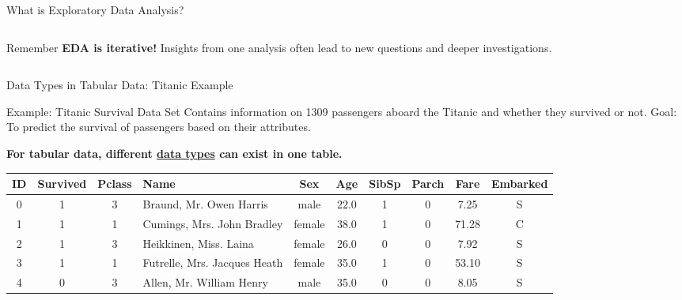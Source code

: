 \documentclass[8pt,aspectratio=1610]{beamer}
\begin{document}
\begin{frame}{What is Exploratory Data Analysis?}
\begin{columns}[t]
\begin{column}{0.48\textwidth}

\vspace{0.4cm}
\begin{alertblock}{Remember}
\textbf{EDA is iterative!} Insights from one analysis often lead to new questions and deeper investigations.
\end{alertblock}
\end{column}
\end{columns}
\end{frame}

\begin{frame}{Data Types in Tabular Data: Titanic Example}
\vspace{-0.3cm}

\begin{block}{Example: Titanic Survival Data Set}
Contains information on 1309 passengers aboard the Titanic and whether they survived or not. Goal: To predict the survival of passengers based on their attributes.
\end{block}

\vspace{0.2cm}
\textbf{For tabular data, different \underline{data types} can exist in one table.}

\vspace{0.3cm}
\begin{center}
\tiny
\begin{tabular}{|c|c|c|l|c|c|c|c|c|c|}
\hline
\textbf{ID} & \textbf{Survived} & \textbf{Pclass} & \textbf{Name} & \textbf{Sex} & \textbf{Age} & \textbf{SibSp} & \textbf{Parch} & \textbf{Fare} & \textbf{Embarked} \\
\hline
0 & 1 & 3 & Braund, Mr. Owen Harris & male & 22.0 & 1 & 0 & 7.25 & S \\
\hline
1 & 1 & 1 & Cumings, Mrs. John Bradley & female & 38.0 & 1 & 0 & 71.28 & C \\
\hline
2 & 1 & 3 & Heikkinen, Miss. Laina & female & 26.0 & 0 & 0 & 7.92 & S \\
\hline
3 & 1 & 1 & Futrelle, Mrs. Jacques Heath & female & 35.0 & 1 & 0 & 53.10 & S \\
\hline
4 & 0 & 3 & Allen, Mr. William Henry & male & 35.0 & 0 & 0 & 8.05 & S \\
\hline
\end{tabular}
\end{center}


\end{frame}
\end{document}
